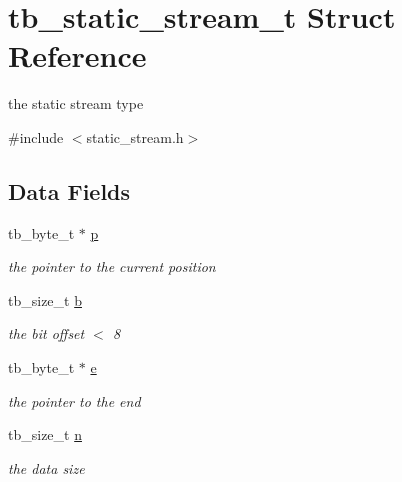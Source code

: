 \hypertarget{structtb__static__stream__t}{\section{tb\-\_\-static\-\_\-stream\-\_\-t Struct Reference}
\label{structtb__static__stream__t}
}


the static stream type  




{\ttfamily \#include $<$static\-\_\-stream.\-h$>$}

\subsection*{Data Fields}
\begin{DoxyCompactItemize}
\item 
\hypertarget{structtb__static__stream__t_a23d8013e28e6b4faec44752e5fbd9a85}{tb\-\_\-byte\-\_\-t $\ast$ \hyperlink{structtb__static__stream__t_a23d8013e28e6b4faec44752e5fbd9a85}{p}}\label{structtb__static__stream__t_a23d8013e28e6b4faec44752e5fbd9a85}

\begin{DoxyCompactList}\small\item\em the pointer to the current position \end{DoxyCompactList}\item 
\hypertarget{structtb__static__stream__t_abd96f05889eeb38c84ce9e9d405a14b0}{tb\-\_\-size\-\_\-t \hyperlink{structtb__static__stream__t_abd96f05889eeb38c84ce9e9d405a14b0}{b}}\label{structtb__static__stream__t_abd96f05889eeb38c84ce9e9d405a14b0}

\begin{DoxyCompactList}\small\item\em the bit offset $<$ 8 \end{DoxyCompactList}\item 
\hypertarget{structtb__static__stream__t_a11b266b7becf36bd22e902a6a82d67e9}{tb\-\_\-byte\-\_\-t $\ast$ \hyperlink{structtb__static__stream__t_a11b266b7becf36bd22e902a6a82d67e9}{e}}\label{structtb__static__stream__t_a11b266b7becf36bd22e902a6a82d67e9}

\begin{DoxyCompactList}\small\item\em the pointer to the end \end{DoxyCompactList}\item 
\hypertarget{structtb__static__stream__t_aa1f84181cb1f21d13c6384a176b6ae87}{tb\-\_\-size\-\_\-t \hyperlink{structtb__static__stream__t_aa1f84181cb1f21d13c6384a176b6ae87}{n}}\label{structtb__static__stream__t_aa1f84181cb1f21d13c6384a176b6ae87}

\begin{DoxyCompactList}\small\item\em the data size \end{DoxyCompactList}\end{DoxyCompactItemize}


